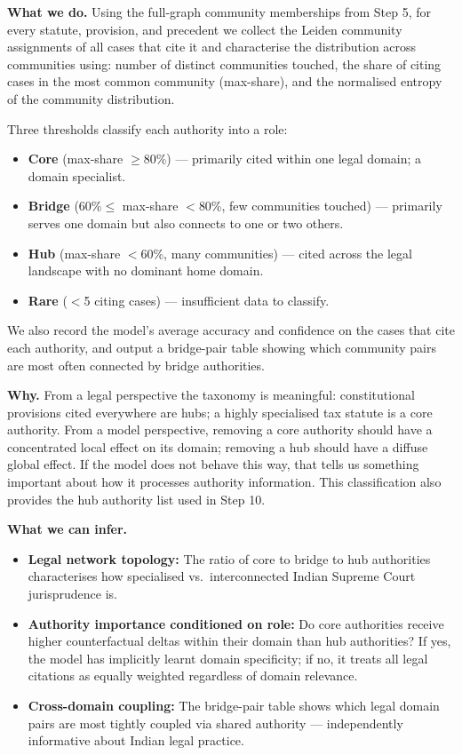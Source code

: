 \documentclass[11pt,a4paper]{article}
\begin{document}
\textbf{What we do.}
Using the full-graph community memberships from Step 5, for every statute, provision,
and precedent we collect the Leiden community assignments of all cases that cite it
and characterise the distribution across communities using: number of distinct
communities touched, the share of citing cases in the most common community
(max-share), and the normalised entropy of the community distribution.

Three thresholds classify each authority into a role:
\begin{itemize}
  \item \textbf{Core} (max-share $\geq$80\%) --- primarily cited within one legal
    domain; a domain specialist.
  \item \textbf{Bridge} (60\%$\leq$ max-share $<$80\%, few communities touched) ---
    primarily serves one domain but also connects to one or two others.
  \item \textbf{Hub} (max-share $<$60\%, many communities) --- cited across the
    legal landscape with no dominant home domain.
  \item \textbf{Rare} ($<$5 citing cases) --- insufficient data to classify.
\end{itemize}
We also record the model's average accuracy and confidence on the cases that cite each
authority, and output a bridge-pair table showing which community pairs are most often
connected by bridge authorities.

\textbf{Why.}
From a legal perspective the taxonomy is meaningful: constitutional provisions cited
everywhere are hubs; a highly specialised tax statute is a core authority. From a
model perspective, removing a core authority should have a concentrated local effect on
its domain; removing a hub should have a diffuse global effect. If the model does not
behave this way, that tells us something important about how it processes authority
information. This classification also provides the hub authority list used in Step 10.

\textbf{What we can infer.}
\begin{itemize}
  \item \textbf{Legal network topology:} The ratio of core to bridge to hub authorities
    characterises how specialised vs.\ interconnected Indian Supreme Court jurisprudence
    is.
  \item \textbf{Authority importance conditioned on role:} Do core authorities receive
    higher counterfactual deltas within their domain than hub authorities? If yes, the
    model has implicitly learnt domain specificity; if no, it treats all legal citations
    as equally weighted regardless of domain relevance.
  \item \textbf{Cross-domain coupling:} The bridge-pair table shows which legal domain
    pairs are most tightly coupled via shared authority --- independently informative
    about Indian legal practice.
\end{itemize}
\end{document}
